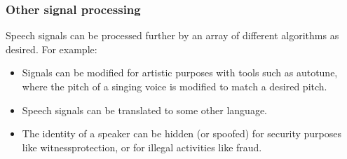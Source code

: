 \documentclass[letterpaper,10pt,english]{jupyterBook}
\begin{document}
\subsubsection{Other signal processing}
\label{\detokenize{Introduction/Applications_and_systems_structures:other-signal-processing}}
\sphinxAtStartPar
Speech signals can be processed further by an array of different
algorithms as desired. For example:
\begin{itemize}
\item {} 
\sphinxAtStartPar
Signals can be modified for artistic purposes with tools such as
auto\sphinxhyphen{}tune, where the pitch of a singing voice is modified to match a
desired pitch.

\item {} 
\sphinxAtStartPar
Speech signals can be translated to some other language.

\item {} 
\sphinxAtStartPar
The identity of a speaker can be hidden (or spoofed) for security
purposes like witness\sphinxhyphen{}protection, or for illegal activities like
fraud.

\end{itemize}

\sphinxAtStartPar
{}

\sphinxstepscope
\end{document}
